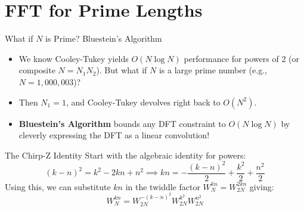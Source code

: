 \section{FFT for Prime Lengths}

\begin{frame}{What if $N$ is Prime? Bluestein's Algorithm}
    \begin{itemize}
        \item We know Cooley-Tukey yields $O(N \log N)$ performance for powers of 2 (or composite $N = N_1 N_2$). But what if $N$ is a large prime number (e.g., $N = 1,000,003$)?
        \item Then $N_1=1$, and Cooley-Tukey devolves right back to $O(N^2)$.
        \item \textbf{Bluestein's Algorithm} bounds any DFT constraint to $O(N \log N)$ by cleverly expressing the DFT as a linear convolution!
    \end{itemize}
    \vspace{0.3cm}
    \begin{insightbox}{The Chirp-Z Identity}
        Start with the algebraic identity for powers:
        \begin{equation*}
            (k-n)^2 = k^2 - 2kn + n^2 \implies kn = -\frac{(k-n)^2}{2} + \frac{k^2}{2} + \frac{n^2}{2}
        \end{equation*}
        Using this, we can substitute $kn$ in the twiddle factor $W_N^{kn} = W_{2N}^{2kn}$ giving:
        \begin{equation*}
            W_N^{kn} = W_{2N}^{-(k-n)^2} W_{2N}^{k^2} W_{2N}^{n^2}
        \end{equation*}
    \end{insightbox}
\end{frame}


